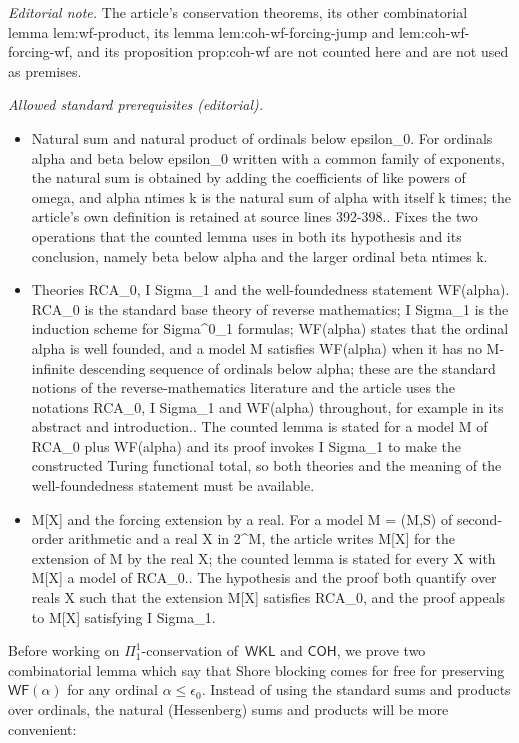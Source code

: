 \documentclass{article}
\numberwithin{theorem}{section}
\newcommand{\WKL}{\mathsf{WKL}}
\newcommand{\COH}{\mathsf{COH}}
\newcommand{\WF}{\mathsf{WF}}
\begin{document}
\noindent\textit{Editorial note.} The article's conservation theorems, its other combinatorial lemma lem:wf-product, its lemma lem:coh-wf-forcing-jump and lem:coh-wf-forcing-wf, and its proposition prop:coh-wf are not counted here and are not used as premises.\par\medskip
\noindent\textit{Allowed standard prerequisites (editorial).}\begin{itemize}
\item Natural sum and natural product of ordinals below epsilon\_0. For ordinals alpha and beta below epsilon\_0 written with a common family of exponents, the natural sum is obtained by adding the coefficients of like powers of omega, and alpha ntimes k is the natural sum of alpha with itself k times; the article's own definition is retained at source lines 392-398.. Fixes the two operations that the counted lemma uses in both its hypothesis and its conclusion, namely beta below alpha and the larger ordinal beta ntimes k.
\item Theories RCA\_0, I Sigma\_1 and the well-foundedness statement WF(alpha). RCA\_0 is the standard base theory of reverse mathematics; I Sigma\_1 is the induction scheme for Sigma\textasciicircum{}0\_1 formulas; WF(alpha) states that the ordinal alpha is well founded, and a model M satisfies WF(alpha) when it has no M-infinite descending sequence of ordinals below alpha; these are the standard notions of the reverse-mathematics literature and the article uses the notations RCA\_0, I Sigma\_1 and WF(alpha) throughout, for example in its abstract and introduction.. The counted lemma is stated for a model M of RCA\_0 plus WF(alpha) and its proof invokes I Sigma\_1 to make the constructed Turing functional total, so both theories and the meaning of the well-foundedness statement must be available.
\item M[X] and the forcing extension by a real. For a model M = (M,S) of second-order arithmetic and a real X in 2\textasciicircum{}M, the article writes M[X] for the extension of M by the real X; the counted lemma is stated for every X with M[X] a model of RCA\_0.. The hypothesis and the proof both quantify over reals X such that the extension M[X] satisfies RCA\_0, and the proof appeals to M[X] satisfying I Sigma\_1.
\end{itemize}\medskip
Before working on $\Pi^1_1$-conservation of~$\WKL$ and $\COH$, we prove two combinatorial lemma which say that Shore blocking comes for free for preserving $\WF(\alpha)$ for any ordinal $\alpha \leq \epsilon_0$. Instead of using the standard sums and products over ordinals, the natural (Hessenberg) sums and products will be more convenient:
\end{document}
